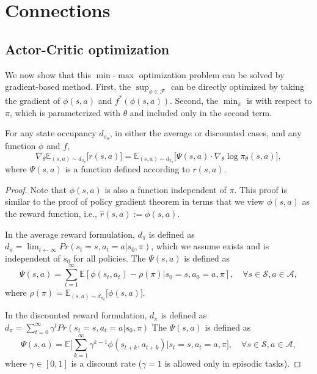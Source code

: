 \section{Connections }

\subsection{Actor-Critic optimization}
We now show that this $\min$-$\max$ optimization problem can be solved by gradient-based method.
First, the $\sup_{\phi\in\mathcal{F}}$ can be directly optimized by taking the gradient of $\phi(s, a)$ and $f^*(\phi(s, a))$. 
Second, the $\min_{\pi}$ is with respect to $\pi$, which is parameterized with $\theta$ and included only in the second term. 

\begin{theorem}\label{theo:policy_gradient}
For any state occupancy $d_{\pi_{\theta}}$, in either the average or discounted cases, and any function $\phi$ and $f$, 
\begin{equation*}
\nabla_\theta \mathbb{E}_{(s, a)\sim d_{\pi_{\theta}}}\big[ r(s, a) \big] = \mathbb{E}_{(s, a)\sim d_{\pi_{\theta}}} \big[ \Psi(s, a) \cdot \nabla_\theta \log \pi_{\theta}(s, a) \big], 
\end{equation*}
where $\Psi(s, a)$ is a function defined according to $r(s, a)$. 
\end{theorem}

\begin{proof}
Note that $\phi(s, a)$ is also a function independent of $\pi$. 
This proof is similar to the proof of policy gradient theorem in terms that we view $\phi(s, a)$ as the reward function, i.e., $\hat{r}(s, a) := \phi(s, a)$. 

In the average reward formulation, $d_\pi$ is defined as $d_{\pi}=\lim_{t\leftarrow\infty}Pr(s_t=s, a_t=a|s_0, \pi)$, which we assume exists and is independent of $s_0$ for all policies. 
The $\Psi(s, a)$ is defined as 
\begin{equation*}
\Psi(s, a) = \sum_{t=1}^{\infty} \mathbb{E}[\phi(s_t, a_t) - \rho(\pi) | s_0 = s, a_0 =a, \pi], \quad \forall s\in\mathcal{S}, a\in\mathcal{A}, 
\end{equation*}
where $\rho(\pi) = \mathbb{E}_{(s, a)\sim d_{\pi_{\theta}}}\big[ \phi(s, a) \big] $. 

In the discounted reward formulation, $d_\pi$ is defined as $d_{\pi}=\sum_{t=0}^{\infty}\gamma^t Pr(s_t=s, a_t=a|s_0, \pi)$
The $\Psi(s, a)$ is defined as 
\begin{equation*}
\Psi(s, a) = \mathbb{E}\big[ \sum_{k=1}^{\infty} \gamma^{k-1} \phi(s_{t+k}, a_{t+k}) | s_t = s, a_t =a, \pi \big], \quad \forall s\in\mathcal{S}, a\in\mathcal{A}, 
\end{equation*}
where $\gamma\in[0, 1]$ is a discount rate ($\gamma=1$ is allowed only in episodic tasks). 
\end{proof}

